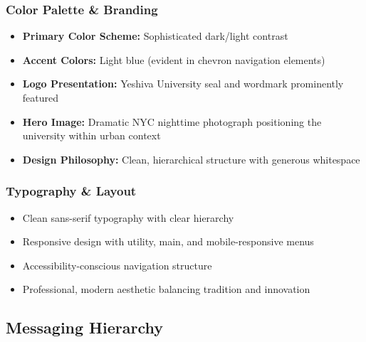 \documentclass[12pt,letterpaper]{article}
\begin{document}
\subsubsection{Color Palette \& Branding}
\begin{itemize}[leftmargin=*]
    \item \textbf{Primary Color Scheme:} Sophisticated dark/light contrast
    \item \textbf{Accent Colors:} Light blue (evident in chevron navigation elements)
    \item \textbf{Logo Presentation:} Yeshiva University seal and wordmark prominently featured
    \item \textbf{Hero Image:} Dramatic NYC nighttime photograph positioning the university within urban context
    \item \textbf{Design Philosophy:} Clean, hierarchical structure with generous whitespace
\end{itemize}

\subsubsection{Typography \& Layout}
\begin{itemize}[leftmargin=*]
    \item Clean sans-serif typography with clear hierarchy
    \item Responsive design with utility, main, and mobile-responsive menus
    \item Accessibility-conscious navigation structure
    \item Professional, modern aesthetic balancing tradition and innovation
\end{itemize}

\subsection{Messaging Hierarchy}
\end{document}
